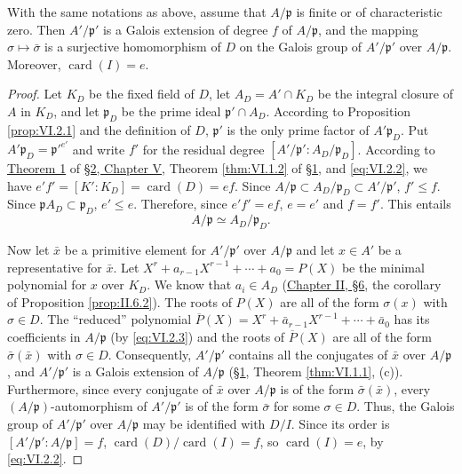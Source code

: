 \begin{proposition}
\label{prop:VI.2.2}
With the same notations as above, assume that $A/\mathfrak{p}$ is finite or
of characteristic zero. Then $A'/\mathfrak{p}'$ is a Galois extension of
degree $f$ of $A/\mathfrak{p}$, and the mapping
$\sigma\mapsto\bar{\sigma}$ is a surjective homomorphism of $D$ on the
Galois group of $A'/\mathfrak{p}'$ over $A/\mathfrak{p}$. Moreover,
$\operatorname{card}(I)=e$.
\end{proposition}

\begin{proof}
Let $K_{D}$ be the fixed field of $D$, let $A_{D}=A'\cap K_{D}$ be the
integral closure of $A$ in $K_{D}$, and let $\mathfrak{p}_{D}$ be the prime
ideal $\mathfrak{p}'\cap A_{D}$. According to Proposition
\ref{prop:VI.2.1} and the definition of $D$, $\mathfrak{p}'$ is the only
prime factor of $A'\mathfrak{p}_{D}$. Put
$A'\mathfrak{p}_{D}=\mathfrak{p}'^{e'}$ and write $f'$ for the residual
degree $[A'/\mathfrak{p}':A_{D}/\mathfrak{p}_{D}]$. According to
\hyperref[thm:V.2.1]{Theorem 1} of \hyperref[sec:5.2]{§2, Chapter V}, Theorem \ref{thm:VI.1.2} of \hyperref[sec:6.1]{§1}, and
\eqref{eq:VI.2.2}, we have
$e'f'=[K':K_{D}]=\operatorname{card}(D)=ef$. Since
$A/\mathfrak{p}\subset A_{D}/\mathfrak{p}_{D}\subset
A'/\mathfrak{p}'$, $f'\leq f$. Since
$\mathfrak{p}A_{D}\subset\mathfrak{p}_{D}$, $e'\leq e$. Therefore, since
$e'f'=ef$, $e=e'$ and $f=f'$. This entails
\begin{equation}
A/\mathfrak{p}\simeq A_{D}/\mathfrak{p}_{D}.
\label{eq:VI.2.3}
\end{equation}

Now let $\bar{x}$ be a primitive element for $A'/\mathfrak{p}'$ over
$A/\mathfrak{p}$ and let $x\in A'$ be a representative for $\bar{x}$. Let
$X^{r}+a_{r-1}X^{r-1}+\cdots+a_{0}=P(X)$ be the minimal polynomial for
$x$ over $K_{D}$. We know that $a_{i}\in A_{D}$ (\hyperref[sec:2.6]{Chapter II, §6}, the
corollary of Proposition \ref{prop:II.6.2}). The roots of $P(X)$ are all
of the form $\sigma(x)$ with $\sigma\in D$. The ``reduced'' polynomial
$\overline{P}(X)=X^{r}+\bar{a}_{r-1}X^{r-1}+\cdots+\bar{a}_{0}$ has its
coefficients in $A/\mathfrak{p}$ (by \eqref{eq:VI.2.3}) and the roots of
$\overline{P}(X)$ are all of the form $\bar{\sigma}(\bar{x})$ with
$\sigma\in D$. Consequently, $A'/\mathfrak{p}'$ contains all the
conjugates of $\bar{x}$ over $A/\mathfrak{p}$, and
$A'/\mathfrak{p}'$ is a Galois extension of $A/\mathfrak{p}$ (\hyperref[sec:6.1]{§1},
Theorem \ref{thm:VI.1.1}, (c)). Furthermore, since every conjugate of
$\bar{x}$ over $A/\mathfrak{p}$ is of the form
$\bar{\sigma}(\bar{x})$, every $(A/\mathfrak{p})$-automorphism of
$A'/\mathfrak{p}'$ is of the form $\bar{\sigma}$ for some $\sigma\in D$.
Thus, the Galois group of $A'/\mathfrak{p}'$ over $A/\mathfrak{p}$ may be
identified with $D/I$. Since its order is
$[A'/\mathfrak{p}':A/\mathfrak{p}]=f$,
$\operatorname{card}(D)/\operatorname{card}(I)=f$, so
$\operatorname{card}(I)=e$, by \eqref{eq:VI.2.2}.
\end{proof}

